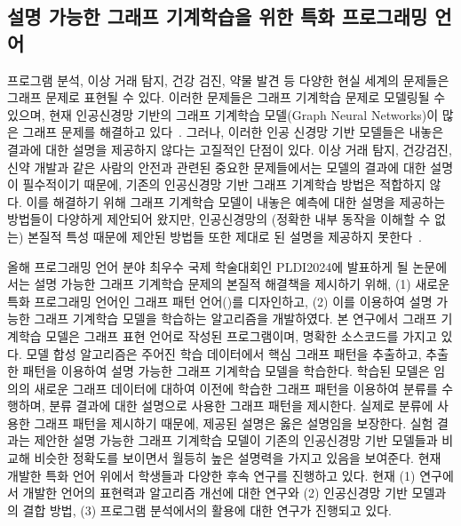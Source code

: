 \documentclass[11pt]{article}
\begin{document}
\begin{spacing}{1.145}
\section{설명 가능한 그래프 기계학습을 위한 특화 프로그래밍 언어}
\hspace{\parindent}
프로그램 분석, 이상 거래 탐지, 건강 검진, 약물 발견 등 다양한 현실 세계의 문제들은 그래프 문제로 표현될 수 있다.
%
이러한 문제들은 그래프 기계학습 문제로 모델링될 수 있으며, 현재 인공신경망 기반의 그래프 기계학습 모델(Graph Neural Networks)이 많은 그래프 문제를 해결하고 있다~\cite{wu2019comprehensive}.
%
그러나, 이러한 인공 신경망 기반 모델들은 내놓은 결과에 대한 설명을 제공하지 않다는 고질적인 단점이 있다.
%
이상 거래 탐지, 건강검진, 신약 개발과 같은 사람의 안전과 관련된 중요한 문제들에서는 모델의 결과에 대한 설명이 필수적이기 때문에, 기존의 인공신경망 기반 그래프 기계학습 방법은 적합하지 않다.
%
이를 해결하기 위해 그래프 기계학습 모델이 내놓은 예측에 대한 설명을 제공하는 방법들이 다양하게 제안되어 왔지만, 인공신경망의 (정확한 내부 동작을 이해할 수 없는) 본질적 특성 때문에 제안된 방법들 또한 제대로 된 설명을 제공하지 못한다~\cite{yuan20survey}.



올해 프로그래밍 언어 분야 최우수 국제 학술대회인 PLDI2024에 발표하게 될 논문에서는 설명 가능한 그래프 기계학습 문제의 본질적 해결책을 제시하기 위해, (1) 새로운 특화 프로그래밍 언어인 그래프 패턴 언어(\GDL)를 디자인하고, (2) 이를 이용하여 설명 가능한 그래프 기계학습 모델을 학습하는 알고리즘을 개발하였다.
%
본 연구에서 그래프 기계학습 모델은 그래프 표현 언어로 작성된 프로그램이며, 명확한 소스코드를 가지고 있다.
%
모델 합성 알고리즘은 주어진 학습 데이터에서 핵심 그래프 패턴을 추출하고, 추출한 패턴을 이용하여 설명 가능한 그래프 기계학습 모델을 학습한다.
%
학습된 모델은 임의의 새로운 그래프 데이터에 대하여 이전에 학습한 그래프 패턴을 이용하여 분류를 수행하며, 분류 결과에 대한 설명으로 사용한 그래프 패턴을 제시한다.
%
실제로 분류에 사용한 그래프 패턴을 제시하기 때문에, 제공된 설명은 옳은 설명임을 보장한다.
%
실험 결과는 제안한 설명 가능한 그래프 기계학습 모델이 기존의 인공신경망 기반 모델들과 비교해 비슷한 정확도를 보이면서 월등히 높은 설명력을 가지고 있음을 보여준다.
%
현재 개발한 특화 언어 위에서 학생들과 다양한 후속 연구를 진행하고 있다.
%
현재 (1) 연구에서 개발한 언어의 표현력과 알고리즘 개선에 대한 연구와 (2) 인공신경망 기반 모델과의 결합 방법, (3) 프로그램 분석에서의 활용에 대한 연구가 진행되고 있다.






\end{spacing}
\end{document}
